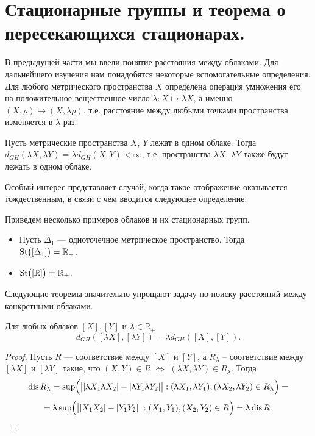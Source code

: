 
\section{Стационарные группы и теорема о пересекающихся стационарах.}
В предыдущей части мы ввели понятие расстояния между облаками. Для дальнейшего изучения нам понадобятся некоторые вспомогательные определения. Для любого метрического пространства $X$ определена операция умножения его на положительное вещественное число $\lambda\colon X\mapsto \lambda X$, а именно $(X, \rho) \mapsto (X, \lambda \rho)$, т.е. расстояние между любыми точками пространства изменяется в $\lambda$ раз.
\begin{remark}
	Пусть метрические пространства $X$, $Y$ лежат в одном облаке. Тогда $d_{GH}(\lambda X, \lambda Y) = \lambda d_{GH}(X,Y) < \infty$, т.е. пространства $\lambda X$, $\lambda Y$ также будут лежать в одном облаке.
\end{remark} 
Особый интерес представляет случай, когда такое отображение оказывается тождественным, в связи с чем вводится следующее определение.

Приведем несколько примеров облаков и их стационарных групп.

\begin{itemize}
		\item Пусть $\Delta_1$ --- одноточечное метрическое пространство. Тогда\\ $\operatorname{St}\bigl([\Delta_1]\bigr) = \mathbb{R}_+$.
		\item $\operatorname{St}\bigl([\mathbb{R}]\bigr) = \mathbb{R}_+ $.
\end{itemize}


Следующие теоремы значительно упрощают задачу по поиску расстояний между конкретными облаками.
\begin{theorem}
	Для любых облаков $[X], [Y]$ и $\lambda \in \mathbb{R}_+$ $$d_{GH}([\lambda X], [\lambda Y]) = \lambda d_{GH}([X], [Y]).$$
\end{theorem}
\begin{proof}
Пусть $R$ --- соответствие между $[X]$ и $[Y]$, а $R_\lambda$ -- соответствие между $[\lambda X]$ и $[\lambda Y]$ такие, что $(X, Y)\in R$ $\Leftrightarrow$ $(\lambda X, \lambda Y) \in R_\lambda$. Тогда\\ $$\operatorname{dis}{R_{\uplambda}} = \sup\Bigl(\big||\uplambda X_1 \uplambda X_2| - |\uplambda Y_1 \uplambda Y_2|\big| : (\uplambda X_1, \uplambda Y_1), (\uplambda X_2, \uplambda Y_2) \in R_{\uplambda} \Bigr) =$$ $$=  \uplambda \sup\Bigl(\big||X_1 X_2| - |Y_1 Y_2|\big| : (X_1, Y_1), (X_2, Y_2)\in R\Bigr) = \uplambda \operatorname{dis}{R}.$$ 
\end{proof}

